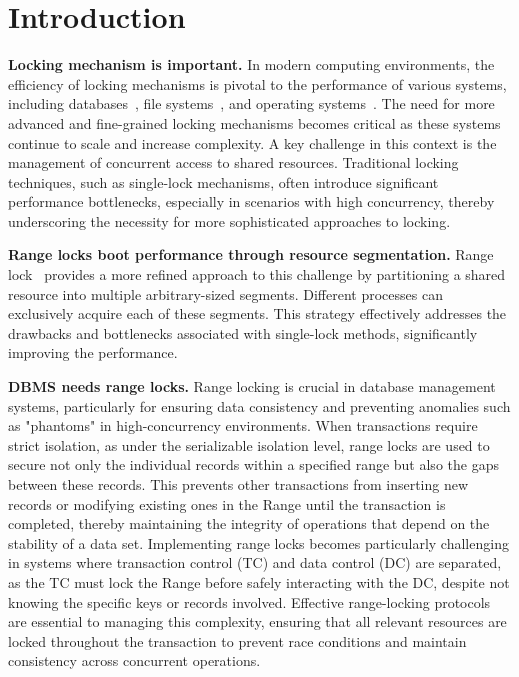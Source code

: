 
\chapter{Introduction}\label{chapter:introduction}

\textbf{Locking mechanism is important.}
In modern computing environments, the efficiency of locking mechanisms is pivotal to the performance of various systems, including databases~\parencite{lomet1993key, graefe2007hierarchical}, file systems~\parencite{lee2021concurrent, gao2023citron, lee2019write}, and operating systems~\parencite{readerWriterLocks2017, mmapSem2017}. The need for more advanced and fine-grained locking mechanisms becomes critical as these systems continue to scale and increase complexity. A key challenge in this context is the management of concurrent access to shared resources. Traditional locking techniques, such as single-lock mechanisms, often introduce significant performance bottlenecks, especially in scenarios with high concurrency, thereby underscoring the necessity for more sophisticated approaches to locking.

\textbf{Range locks boot performance through resource segmentation.} 
Range lock~\parencite{gao2023citron, kogan2020scalable} provides a more refined approach to this challenge by partitioning a shared resource into multiple arbitrary-sized segments. Different processes can exclusively acquire each of these segments. This strategy effectively addresses the drawbacks and bottlenecks associated with single-lock methods, significantly improving the performance.

\textbf{DBMS needs range locks.}
Range locking is crucial in database management systems, particularly for ensuring data consistency and preventing anomalies such as "phantoms" in high-concurrency environments. 
When transactions require strict isolation, as under the serializable isolation level, range locks are used to secure not only the individual records within a specified range but also the gaps between these records. 
This prevents other transactions from inserting new records or modifying existing ones in the Range until the transaction is completed, thereby maintaining the integrity of operations that depend on the stability of a data set. 
Implementing range locks becomes particularly challenging in systems where transaction control (TC) and data control (DC) are separated, as the TC must lock the Range before safely interacting with the DC, despite not knowing the specific keys or records involved. 
Effective range-locking protocols are essential to managing this complexity, ensuring that all relevant resources are locked throughout the transaction to prevent race conditions and maintain consistency across concurrent operations.

